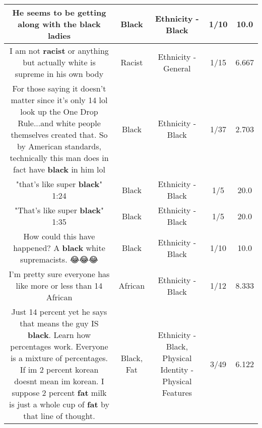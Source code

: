 \documentclass[11pt]{article}
\newlength\mylength
\begin{document}
\begin{center}
\begin{longtable}{|C{.65\mylength}|C{.30\mylength}|C{.12\mylength}|C{.12\mylength}|C{.12\mylength}|}
  \small He seems to be getting along with the \textbf{black} ladies\normalsize   & Black & Ethnicity - Black & 1/10 & 10.0 \\  \hline
  \small I am not \textbf{racist} or anything but actually white is supreme in his own body\normalsize   & Racist & Ethnicity - General & 1/15 & 6.667 \\  \hline
  \small For those saying it doesn't matter since it's only 14 lol look up the One Drop Rule...and white people themselves created that. So by American standards, technically this man does in fact have \textbf{black} in him lol\normalsize   & Black & Ethnicity - Black & 1/37 & 2.703 \\  \hline
  \small "that's like super \textbf{black}" 1:24\normalsize   & Black & Ethnicity - Black & 1/5 & 20.0 \\  \hline
  \small "That's like super \textbf{black}" 1:35\normalsize   & Black & Ethnicity - Black & 1/5 & 20.0 \\  \hline
  \small How could this have happened? A \textbf{black} white supremacists. 😂😂😂\normalsize   & Black & Ethnicity - Black & 1/10 & 10.0 \\  \hline
  \small I'm pretty sure everyone has like more or less than 14 African\normalsize   & African & Ethnicity - Black & 1/12 & 8.333 \\  \hline
  \small Just 14 percent yet he says that means the guy IS \textbf{black}. Learn how percentages work. Everyone is a mixture of percentages. If im 2 percent korean doesnt mean im korean. I suppose 2 percent \textbf{fat} milk is just a whole cup of \textbf{fat} by that line of thought.\normalsize   & Black, Fat & Ethnicity - Black, Physical Identity - Physical Features & 3/49 & 6.122 \\  \hline

\end{longtable}
\end{center}
\end{document}
